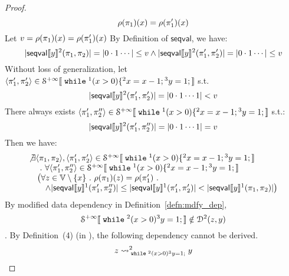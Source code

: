 \begin{example}
\begin{proof}
\[ 	\rho(\pi_1)(x) = \rho(\pi_1')(x)
 \]
 Let $v = \rho(\pi_1)(x) = \rho(\pi_1')(x)$
 By Definition of $\mathsf{seqval}$, we have:
 \[
 	|\mathsf{seqval}\llbracket y \rrbracket{}^2(\pi_1, \pi_2 )| = | 0 \cdot 1 \cdots| \leq v
 	\land
 	|\mathsf{seqval}\llbracket y \rrbracket{}^2(\pi_1', \pi_2' )| = | 0 \cdot 1 \cdots| \leq v
 \]
 Without loss of generalization, let $\langle \pi_1', \pi_2' \rangle \in \mathcal{S}^{+\infty}\llbracket \;\mathtt{while}\; {}^1 (x > 0) \{{}^2 x = x - 1; {}^3 y = 1; \rrbracket $ s.t.
 \[
 |\mathsf{seqval}\llbracket y \rrbracket{}^2(\pi_1', \pi_2' )| = | 0 \cdot 1 \cdots 1| < v
 \]
 There always exists $\langle \pi_1', \pi_2'' \rangle \in \mathcal{S}^{+\infty}\llbracket \;\mathtt{while}\; {}^1 (x > 0) \{{}^2 x = x - 1; {}^3 y = 1; \rrbracket$ s.t.:
 \[
 	|\mathsf{seqval}\llbracket y \rrbracket{}^2(\pi_1', \pi_2'' )| = | 0 \cdot 1 \cdots 1| = v
 \]
 Then we have:
 \[
 	\begin{array}{l}
 	\not\exists \langle \pi_1, \pi_2 \rangle, \langle \pi_1', \pi_2' \rangle \in \mathcal{S}^{+\infty}\llbracket \;\mathtt{while}\; {}^1 (x > 0) \{{}^2 x = x - 1; {}^3 y = 1; \rrbracket \\
 	\quad ~.~ \forall \langle \pi_1', \pi_2'' \rangle \in \mathcal{S}^{+\infty}\llbracket \;\mathtt{while}\; {}^1 (x > 0) \{{}^2 x = x - 1; {}^3 y = 1; \rrbracket \\
 	\quad \big(
 	\forall z \in \mathbb{V}\setminus \{x\} ~.~ \rho(\pi_1)(z) = \rho(\pi_1') ~.~ \\
 	\quad  \quad  \land |\mathsf{seqval}\llbracket y \rrbracket{}^1(\pi_1', \pi_2'')| 
 	\leq |\mathsf{seqval}\llbracket y \rrbracket{}^1(\pi_1', \pi_2')| <  
 	|\mathsf{seqval}\llbracket y \rrbracket{}^1(\pi_1, \pi_2)|\big) 	
 	\end{array}
 \]
 By modified data dependency in Definition~\ref{defn:mdfy_dep},
 \[
 	\mathcal{S}^{+\infty}\llbracket \;\mathtt{while}\; {}^2 (x > 0) {}^3 y = 1; \rrbracket 
 	\notin \mathcal{D}^2(z, y)
 \].
 By Definition~(4) (in \cite{cousot2019abstract}), the following dependency cannot be derived.
 \[
 	z \rightsquigarrow^{2}_{\;\mathtt{while}\; {}^2 (x > 0) {}^3 y = 1;} y
 \]
 \end{proof}
 \end{example}